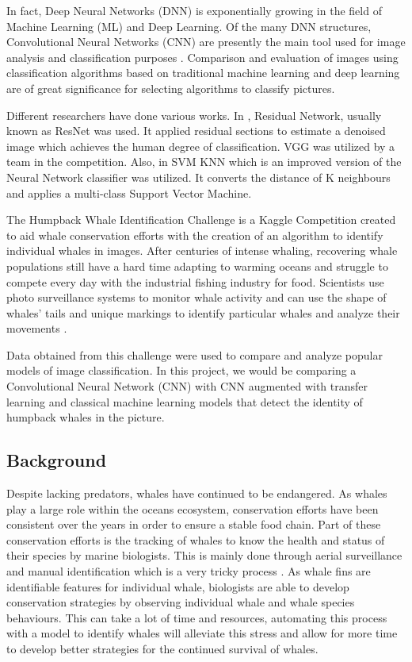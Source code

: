 \documentclass[paper=a4, fontsize=11pt]{scrartcl}
\numberwithin{equation}{section}		%
\numberwithin{table}{section}				%
\begin{document}
In fact, Deep Neural Networks (DNN) is exponentially growing in the field of Machine Learning (ML) and Deep Learning. Of the many DNN structures, Convolutional Neural Networks (CNN) are presently the main tool used for image analysis and classification purposes \cite{jain2000statistical}. Comparison and evaluation of images using classification algorithms based on traditional machine learning and deep learning are of great significance for selecting algorithms to classify pictures. 

Different researchers have done various works. In \cite{he2016deep}, Residual Network, usually known as ResNet was used. It applied residual sections to estimate a denoised image which achieves the human degree of classification. VGG was utilized by a team in the competition\cite{simonyan2014very}. Also, in \cite{zhang2006svm} SVM KNN which is an improved version of the Neural Network classifier was utilized. It converts the distance of K neighbours and applies a multi-class Support Vector Machine. 

The Humpback Whale Identification Challenge is a Kaggle Competition created to aid whale conservation efforts with the creation of an algorithm to identify individual whales in images. After centuries of intense whaling, recovering whale populations still have a hard time adapting to warming oceans and struggle to compete every day with the industrial fishing industry for food. Scientists use photo surveillance systems to monitor whale activity and can use the shape of whales’ tails and unique markings to identify particular whales and analyze their movements \cite{JaisakthiS.M.2017Awms}.

Data obtained from this challenge were used to compare and analyze popular models of image classification. In this project, we would be comparing a Convolutional Neural Network (CNN) with CNN augmented with transfer learning and classical machine learning models that detect the identity of humpback whales in the picture.


\subsection{Background}\label{sec: background}
Despite lacking predators, whales have continued to be endangered. As whales play a large role within the oceans ecosystem, conservation efforts have been consistent over the years in order to ensure a stable food chain. Part of these conservation efforts is the tracking of whales to know the health and status of their species by marine biologists. This is mainly done through aerial surveillance and manual identification which is a very tricky process \cite{JaisakthiS.M.2017Awms}. As whale fins are identifiable features for individual whale, biologists are able to develop conservation strategies by observing individual whale and whale species behaviours. This can take a lot of time and resources, automating this process with a model to identify whales will alleviate this stress and allow for more time to develop better strategies for the continued survival of whales.
\end{document}
